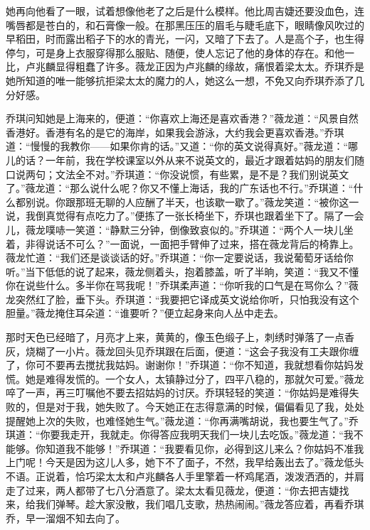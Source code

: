 \par 她再向他看了一眼，试着想像他老了之后是什么模样。他比周吉婕还要没血色，连嘴唇都是苍白的，和石膏像一般。在那黑压压的眉毛与睫毛底下，眼睛像风吹过的早稻田，时而露出稻子下的水的青光，一闪，又暗了下去了。人是高个子，也生得停匀，可是身上衣服穿得那么服贴、随便，使人忘记了他的身体的存在。和他一比，卢兆麟显得粗蠢了许多。薇龙正因为卢兆麟的缘故，痛恨着梁太太。乔琪乔是她所知道的唯一能够抗拒梁太太的魔力的人，她这么一想，不免又向乔琪乔添了几分好感。
\par 乔琪问知她是上海来的，便道：“你喜欢上海还是喜欢香港？”薇龙道：“风景自然香港好。香港有名的是它的海岸，如果我会游泳，大约我会更喜欢香港。”乔琪道：“慢慢的我教你——如果你肯的话。”又道：“你的英文说得真好。”薇龙道：“哪儿的话？一年前，我在学校课室以外从来不说英文的，最近才跟着姑妈的朋友们随口说两句；文法全不对。”乔琪道：“你没说惯，有些累，是不是？我们别说英文了。”薇龙道：“那么说什么呢？你又不懂上海话，我的广东话也不行。”乔琪道：“什么都别说。你跟那班无聊的人应酬了半天，也该歇一歇了。”薇龙笑道：“被你这一说，我倒真觉得有点吃力了。”便拣了一张长椅坐下，乔琪也跟着坐下了。隔了一会儿，薇龙噗哧一笑道：“静默三分钟，倒像致哀似的。”乔琪道：“两个人一块儿坐着，非得说话不可么？”一面说，一面把手臂伸了过来，搭在薇龙背后的椅靠上。薇龙忙道：“我们还是谈谈话的好。”乔琪道：“你一定要说话，我说葡萄牙话给你听。”当下低低的说了起来，薇龙侧着头，抱着膝盖，听了半晌，笑道：“我又不懂你在说些什么。多半你在骂我呢！”乔琪柔声道：“你听我的口气是在骂你么？”薇龙突然红了脸，垂下头。乔琪道：“我要把它译成英文说给你听，只怕我没有这个胆量。”薇龙掩住耳朵道：“谁要听？”便立起身来向人丛中走去。
\par 那时天色已经暗了，月亮才上来，黄黄的，像玉色缎子上，刺绣时弹落了一点香灰，烧糊了一小片。薇龙回头见乔琪跟在后面，便道：“这会子我没有工夫跟你缠了，你可不要再去搅扰我姑妈。谢谢你！”乔琪道：“你不知道，我就想看你姑妈发慌。她是难得发慌的。一个女人，太镇静过分了，四平八稳的，那就欠可爱。”薇龙啐了一声，再三叮嘱他不要去招姑妈的讨厌。乔琪轻轻的笑道：“你姑妈是难得失败的，但是对于我，她失败了。今天她正在志得意满的时候，偏偏看见了我，处处提醒她上次的失败，也难怪她生气。”薇龙道：“你再满嘴胡说，我也要生气了。”乔琪道：“你要我走开，我就走。你得答应我明天我们一块儿去吃饭。”薇龙道：“我不能够。你知道我不能够！”乔琪道：“我要看见你，必得到这儿来么？你姑妈不准我上门呢！今天是因为这儿人多，她下不了面子，不然，我早给轰出去了。”薇龙低头不语。正说着，恰巧梁太太和卢兆麟各人手里擎着一杯鸡尾酒，泼泼洒洒的，并肩走了过来，两人都带了七八分酒意了。梁太太看见薇龙，便道：“你去把吉婕找来，给我们弹琴。趁大家没散，我们唱几支歌，热热闹闹。”薇龙答应着，再看乔琪乔，早一溜烟不知去向了。
